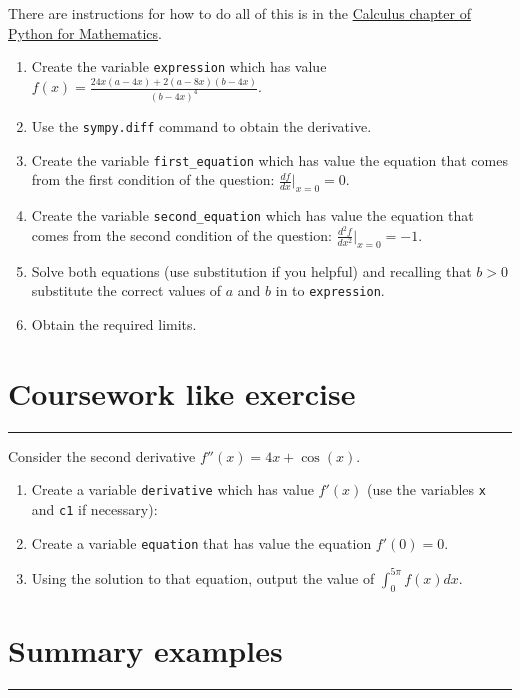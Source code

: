 \documentclass{article}
\begin{document}
There are instructions for how to do all of this is in the
\href{https://vknight.org/pfm/tools-for-mathematics/03-calculus/how/main.html}{Calculus chapter of Python for Mathematics}.


\begin{enumerate}
\item
  Create the variable \texttt{expression} which has value
        $f(x)= \frac{24 x \left(a - 4 x\right) + 2 \left(a - 8 x\right) \left(b - 4 x\right)}{\left(b - 4 x\right)^{4}}$.
\item Use the \texttt{sympy.diff} command to obtain the
        derivative.
\item Create the variable \texttt{first_equation} which has value the
    equation that comes from the first condition of the question:
        $\frac{df}{dx}|_{x=0} = 0$.
\item Create the variable \texttt{second_equation} which has value the
    equation that comes from the second condition of the question:
        $\frac{d^2f}{dx^2}|_{x=0} = -1$.
    \item Solve both equations (use substitution if you helpful) and recalling
        that $b>0$ substitute the correct values of $a$ and $b$ in to
        \texttt{expression}.
    \item Obtain the required limits.
\end{enumerate}


\section{Coursework like exercise}
\hrule


Consider the second derivative $f''(x)=4 x + \cos(x)$.

\begin{enumerate}
    \item Create a variable \texttt{derivative} which has value 
        $f'(x)$ (use the variables \texttt{x} and
        \texttt{c1} if necessary):
    \item Create a variable \texttt{equation} that has value the 
        equation $f'(0)=0$.
    \item Using the solution to that equation, output the value of $\int_{0}^{5\pi}f(x)dx$.
\end{enumerate}

\section{Summary examples}
\hrule
\end{document}
